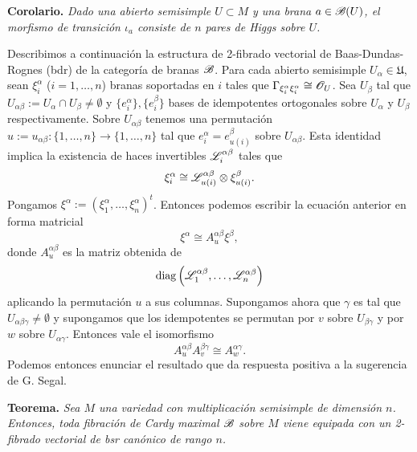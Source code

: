 {{\bf Corolario.} {\it Dado una abierto semisimple $U\subset M$ y una brana $a\in \mathscr{B}(U)$, el morfismo de transici\'on $\iota_a$ consiste de $n$ pares de Higgs sobre $U$.}
\medskip

Describimos a continuaci\'on la estructura de 2-fibrado vectorial de Baas-Dundas-Rognes ({\sc bdr}) de la categor\'ia de branas $\mathscr{B}$. Para cada abierto semisimple $U_\alpha \in \mathfrak{U}$, sean $\xi_i^\alpha$ ($i=1,\dots ,n$) branas soportadas en $i$ tales que $\Gamma_{\xi_i^\alpha \xi_i^\alpha}\cong \mathscr{O}_U$. Sea $U_\beta$ tal que $U_{\alpha \beta}:=U_\alpha \cap U_\beta \neq \emptyset$ y $\{e_i^\alpha \},\{e_i^\beta \}$ bases de idempotentes ortogonales sobre $U_\alpha$ y $U_\beta$ respectivamente. Sobre $U_{\alpha \beta}$ tenemos una permutaci\'on $u:=u_{\alpha \beta}:\{1,\dots ,n\}\to \{1,\dots ,n\}$ tal que $e_i^\alpha =e_{u(i)}^\beta$ sobre $U_{\alpha \beta}$. Esta identidad implica la existencia de haces invertibles $\mathscr{L}_i^{\alpha \beta}$ tales que
$$\xi_i^\alpha \cong \mathscr{L}_{u(i)}^{\alpha \beta}\otimes \xi_{u(i)}^\beta.$$
Pongamos $\xi^\alpha :=(\xi_1^\alpha ,\dots ,\xi_n^\alpha )^t$. Entonces podemos escribir la ecuaci\'on anterior en forma matricial
$$\xi^\alpha \cong A_u^{\alpha \beta}\xi^\beta,$$
donde $A_u^{\alpha \beta}$ es la matriz obtenida de
$$\operatorname{diag}\left (\mathscr{L}_1^{\alpha \beta},\dots ,\mathscr{L}_n^{\alpha \beta}\right )$$
aplicando la permutaci\'on $u$ a sus columnas. Supongamos ahora que $\gamma$ es tal que $U_{\alpha \beta \gamma}\neq \emptyset$ y supongamos que los idempotentes se permutan por $v$ sobre $U_{\beta \gamma}$ y por $w$ sobre $U_{\alpha \gamma}$. Entonces vale el isomorfismo
$$A_u^{\alpha \beta}A_v^{\beta \gamma}\cong A_w^{\alpha \gamma}.$$
Podemos entonces enunciar el resultado que da respuesta positiva a la sugerencia de G. Segal.
\medskip

{\bf Teorema.} {\it Sea $M$ una variedad con multiplicaci\'on semisimple de dimensi\'on $n$. Entonces, toda fibraci\'on de Cardy maximal $\mathscr{B}$ sobre $M$ viene equipada con un 2-fibrado vectorial de {\sc bsr} can\'onico de rango $n$.}












}





